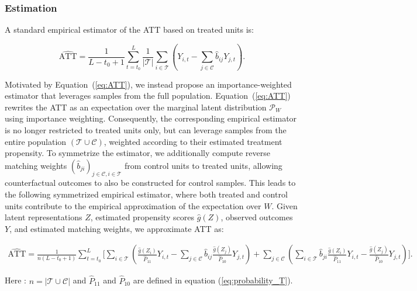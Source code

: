 \documentclass[10pt]{article} %
\begin{document}
\subsubsection*{Estimation}
A standard empirical estimator of the ATT based on treated units is:

\begin{equation}
\hat{\mathrm{ATT}} =\frac{1}{L-t_0+1}\sum_{t=t_0}^{L}\frac{1}{|\mathcal{T}| } \sum_{i \in \mathcal{T} }(Y_{i,t} - \sum_{j \in \mathcal{C}} \hat{b}_{ij} Y_{j,t}).
\label{eq:estimator_1}
\end{equation}


{Motivated by Equation~(\ref{eq:ATT}), we instead propose an importance-weighted estimator that leverages samples from the full population. Equation~(\ref{eq:ATT}) rewrites the ATT as an expectation over the marginal latent distribution \(\mathcal P_W\) using importance weighting. Consequently, the corresponding empirical estimator is no longer restricted to treated units only, but can leverage samples from the entire population \((\mathcal T \cup \mathcal C)\), weighted according to their estimated treatment propensity.}
{
To symmetrize the estimator, we additionally compute reverse matching weights \((\hat b_{ji})_{j \in \mathcal{C}, i\in \mathcal{T}}\) from control units to treated units, allowing counterfactual outcomes to also be constructed for control samples. This leads to the following symmetrized empirical estimator, where both treated and control units contribute to the empirical approximation of the expectation over \(W\).}
Given latent representations \(Z\), estimated propensity scores \(\hat{g}(Z)\), observed outcomes \(Y\), and estimated matching weights, we approximate ATT as:


\begin{align}
\hat{\text{ATT}} =\frac{1}{n (L-t_0+1) } \sum_{t=t_0}^{L} \Bigg[ \sum_{i \in \mathcal{T}} \left(\frac{\hat{g}(Z_i)}{\hat{ P}_{11}} Y_{i,t} - \sum_{j \in \mathcal{C}} \hat{b}_{ij} \frac{\hat{g}(Z_j)}{\hat{P}_{10}} Y_{j,t} \right)+ \sum_{j \in \mathcal{C}}\left( \sum_{i \in \mathcal{T}} \hat{b}_{ji} \frac{\hat{g}(Z_i)}{\hat{ P}_{11}} Y_{i,t} -  \frac{\hat{g}(Z_j)}{\hat{ P}_{10}} Y_{j,t}\right)\Bigg].
\label{eq:estimator_2}
\end{align}

Here : \(n=|\mathcal{T}\cup \mathcal{C}|\) and \(\hat{P}_{11}\) and \(\hat{P}_{10}\) are defined in equation (\ref{eq:probability_T}). 
\end{document}

